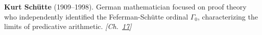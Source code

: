 \textbf{Kurt Schütte} (1909–1998). German mathematician focused on proof theory who independently identified the Feferman-Sch\"{u}tte ordinal $\Gamma_0$, characterizing the limits of predicative arithmetic. \emph{[Ch.~\hyperref[ch:bignumbers]{17}]}

